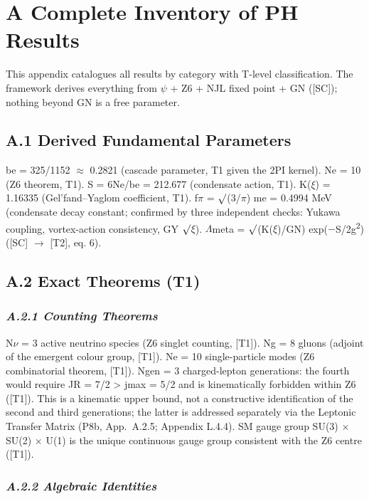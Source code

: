 \documentclass[11pt,letterpaper]{article}
\begin{document}
\clearpage
\section*{A  Complete Inventory of PH Results}

\noindent This appendix catalogues all results by category with T-level classification. The framework derives everything from $\psi$ + Z6 + NJL fixed point + GN ([SC]); nothing beyond GN is a free parameter.

\subsection*{A.1  Derived Fundamental Parameters}

\noindent be = 325/1152 $\approx$ 0.2821 (cascade parameter, T1 given the 2PI kernel). Ne = 10 (Z6 theorem, T1). S = 6Ne/be = 212.677 (condensate action, T1). K($\xi$) = 1.16335 (Gel'fand--Yaglom coefficient, T1). f$\pi$ = $\surd$(3/$\pi$) me = 0.4994 MeV (condensate decay constant; confirmed by three independent checks: Yukawa coupling, vortex-action consistency, GY $\surd$$\xi$). $\Lambda$meta = $\surd$(K($\xi$)/GN) exp($-$S/2g\textsuperscript{2}) ([SC] $\to$ [T2], eq. 6).

\subsection*{A.2  Exact Theorems (T1)}

\subsubsection*{\itshape A.2.1  Counting Theorems}

\noindent N$\nu$ = 3 active neutrino species (Z6 singlet counting, [T1]). Ng = 8 gluons (adjoint of the emergent colour group, [T1]). Ne = 10 single-particle modes (Z6 combinatorial theorem, [T1]). Ngen = 3 charged-lepton generations: the fourth would require JR = 7/2 > jmax = 5/2 and is kinematically forbidden within Z6 ([T1]). This is a kinematic upper bound, not a constructive identification of the second and third generations; the latter is addressed separately via the Leptonic Transfer Matrix (P8b, App.\ A.2.5; Appendix L.4.4). SM gauge group SU(3) $\times$ SU(2) $\times$ U(1) is the unique continuous gauge group consistent with the Z6 centre ([T1]).

\subsubsection*{\itshape A.2.2  Algebraic Identities}
\end{document}
